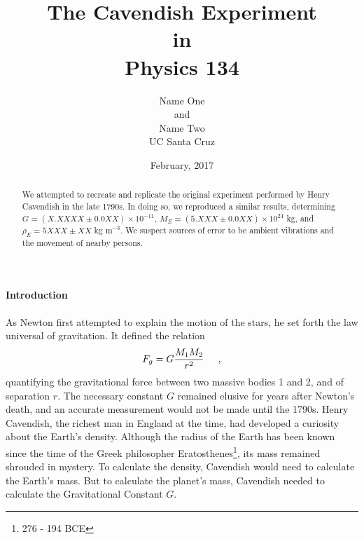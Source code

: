



\begin{singlespace}

	\title{\textbf{The Cavendish Experiment} \\  in \\ Physics 134}
	\date{February, 2017}
	\author{Name One \\ and \\ Name Two \\ UC Santa Cruz}
	\maketitle

\end{singlespace}

\vspace{2cm}

\begin{abstract}

	We attempted to recreate and replicate the original experiment performed by Henry Cavendish in the late 1790s. 
	In doing so, we reproduced a similar results, determining \(G = \left(X.XXXX\pm 0.0XX\right)\times 10^{-11}\), \(M_{E} = (5.XXX\pm0.0XX)\times 10^{24}\) kg, and \(\rho_{E} = 5XXX\pm XX\) kg m\(^{-3}\). 
	We suspect sources of error to be ambient vibrations and the movement of nearby persons. 

\end{abstract}

\pagebreak
\twocolumn	

\paragraph{Introduction}

\paragraph{} As Newton first attempted to explain the motion of the stars, he set forth the law universal of gravitation. 
It defined the relation
\begin{equation}
	F_{g} = G \dfrac{M_{1}M_{2}}{r^{2}}\hspace{0.5cm},
	\end{equation}
quantifying the gravitational force between two massive bodies 1 and 2, and of separation \(r\). 
The necessary constant \(G\) remained elusive for years after Newton's death, and an accurate measurement would not be made until the 1790s. 
Henry Cavendish, the richest man in England at the time, had developed a curiosity about the Earth's density. 
Although the radius of the Earth has been known since the time of the Greek philosopher Eratosthenes\footnote{276 - 194 BCE}, its mass remained shrouded in mystery. 
To calculate the density, Cavendish would need to calculate the Earth's mass. But to calculate the planet's mass, Cavendish needed to calculate the Gravitational Constant \(G\). \cite{134Manual}


